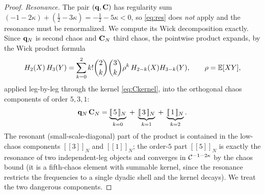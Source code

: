 \begin{proof}
\emph{Resonance.} The pair $(\mathbf{q},\mathbf{C})$ has regularity sum
$(-1-2\kappa)+(\tfrac12-3\kappa)=-\tfrac12-5\kappa<0$, so \eqref{eq:res} does
\emph{not} apply and the resonance must be renormalized. We compute its Wick
decomposition exactly. Since $\mathbf{q}_N$ is second chaos and $\mathbf{C}_N$ third
chaos, the pointwise product expands, by the Wick product formula
\[
H_2(X)\,H_3(Y)=\sum_{k=0}^{2}k!\binom{2}{k}\binom{3}{k}\rho^{k}\,H_{2-k}(X)H_{3-k}(Y),
\qquad\rho=\mathbb{E}[XY],
\]
applied leg-by-leg through the kernel \eqref{eq:Ckernel}, into the orthogonal
chaos components of order $5,3,1$:
\begin{equation}\label{eq:wickC}
\mathbf{q}_N\,\mathbf{C}_N=\underbrace{[\![\,5\,]\!]_N}_{k=0}\;+\;\underbrace{[\![\,3\,]\!]_N}_{k=1}\;+\;\underbrace{[\![\,1\,]\!]_N}_{k=2}.
\end{equation}
The resonant (small-scale-diagonal) part of the product is contained in the
low-chaos components $[\![3]\!]_N$ and $[\![1]\!]_N$; the order-$5$ part $[\![5]\!]_N$
is exactly the resonance of two independent-leg objects and converges in
$\mathcal{C}^{-1-2\kappa}$ by the chaos bound (it is a fifth-chaos element with summable
kernel, since the resonance restricts the frequencies to a single dyadic shell and
the kernel decays). We treat the two dangerous components.


\end{proof}
